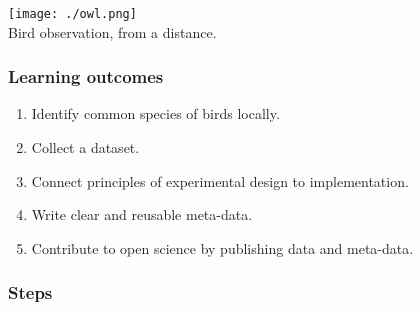 \documentclass[
]{book}
\providecommand{\tightlist}{%
  \setlength{\itemsep}{0pt}\setlength{\parskip}{0pt}}
\begin{document}
\texttt{[image: ./owl.png]}\\
Bird observation, from a distance.

\hypertarget{learning-outcomes}{%
\subsubsection*{Learning outcomes}\label{learning-outcomes}}

\begin{enumerate}
\def\labelenumi{\arabic{enumi}.}
\tightlist
\item
  Identify common species of birds locally.\\
\item
  Collect a dataset.\\
\item
  Connect principles of experimental design to implementation.\\
\item
  Write clear and reusable meta-data.\\
\item
  Contribute to open science by publishing data and meta-data.
\end{enumerate}

\hypertarget{steps}{%
\subsubsection*{Steps}\label{steps}}
\end{document}

